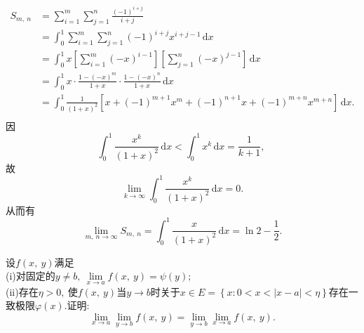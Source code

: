 	\begin{solution}
		\begin{align*}
			S_{m,\ n}&=\sum\limits_{i=1}^{m}\sum\limits_{j=1}^{n}\frac{(-1)^{i+j}}{i+j}\\
			&=\int_{0}^{1}\sum\limits_{i=1}^{m}\sum\limits_{j=1}^{n}(-1)^{i+j}x^{i+j-1}\,\text{d}x\\
			&=\int_{0}^{1}x\left[\sum\limits_{i=1}^{m}(-x)^{i-1}\right]\left[\sum\limits_{j=1}^{n}(-x)^{j-1}\right]\,\text{d}x\\
			&=\int_{0}^{1}x\cdot\frac{1-(-x)^m}{1+x}\cdot\frac{1-(-x)^n}{1+x}\,\text{d}x\\
			&=\int_{0}^{1}\frac{1}{(1+x)^2}\left[x+(-1)^{m+1}x^m+(-1)^{n+1}x+(-1)^{m+n}x^{m+n}\right]\,\text{d}x.\\
		\end{align*}
		因
		$$\int_{0}^{1}\frac{x^k}{(1+x)^2}\,\text{d}x<\int_{0}^{1}x^k\,\text{d}x=\frac{1}{k+1},\ $$
		故
		$$\lim\limits_{k\rightarrow\infty}\int_{0}^{1}\frac{x^k}{(1+x)^2}\,\text{d}x=0.$$
		从而有
		$$\lim\limits_{m,\ n\rightarrow\infty}S_{m,\ n}=\int_{0}^{1}\frac{x}{(1+x)^2}\,\text{d}x=\ln 2-\frac{1}{2}.$$ 
	\end{solution}
	\newpage
	\begin{problem}
		设$f(x,\ y)$满足\\
		(i)对固定的$y\neq b,\ \lim\limits_{x\rightarrow a}f(x,\ y)=\psi(y);$\\
		(ii)存在$\eta>0,\ $使$f(x,\ y)$当$y\rightarrow b$时关于$x\in E=\left\{x:0<x<|x-a|<\eta\right\}$存在一致极限$\varphi(x).$证明:
		$$\lim\limits_{x\rightarrow a}\lim\limits_{y\rightarrow b}f(x,\ y)=\lim\limits_{y\rightarrow b}\lim\limits_{x\rightarrow a}f(x,\ y).$$
	\end{problem}
	

